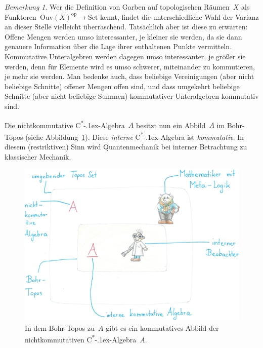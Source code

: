 \documentclass[a4paper,ngerman,12pt]{scrartcl}
\theoremstyle{definition}
\theoremstyle{plain}
\theoremstyle{remark}
\newtheorem{bem}[defn]{Bemerkung}
\newcommand{\Ouv}{\mathrm{Ouv}}
\newcommand{\ul}[1]{\underline{#1}}
\newcommand{\csalgebra}{C\textsuperscript{*}\kern-.1ex-Algebra}
\newcommand{\op}{\mathrm{op}}
\newcommand{\Set}{\mathrm{Set}}
\renewcommand{\_}{\mathpunct{.}\,}
\newcommand{\?}{\,{:}\,}
\begin{document}
\begin{bem}Wer die Definition von Garben auf topologischen Räumen~$X$ als
Funktoren~$\Ouv(X)^\op \to \Set$
kennt, findet die unterschiedliche Wahl der Varianz an dieser Stelle vielleicht
überraschend. Tatsächlich aber ist diese zu erwarten: Offene Mengen werden umso
interessanter, je kleiner sie werden, da sie dann genauere Information über die
Lage ihrer enthaltenen Punkte vermitteln. Kommutative Unteralgebren werden
dagegen umso interessanter, je größer sie werden, denn für Elemente wird
es umso schwerer, miteinander zu kommutieren, je mehr sie werden. Man bedenke auch, dass
beliebige Vereinigungen (aber nicht beliebige Schnitte) offener Mengen offen
sind, und dass umgekehrt beliebige Schnitte (aber nicht beliebige
Summen) kommutativer Unteralgebren kommutativ sind.\end{bem}

Die nichtkommutative \csalgebra~$A$ besitzt nun ein Abbild~$\ul{A}$ im
Bohr-Topos (siehe Abbildung~\ref{fig:bohr-topos}). Diese \emph{interne}
\csalgebra{} ist \emph{kommutativ}. In diesem
(restriktiven) Sinn wird Quantenmechanik bei interner Betrachtung zu klassischer
Mechanik.

\begin{figure}
  \centering
  \includegraphics[scale=3]{bohr-topos-klein}
  \caption{\label{fig:bohr-topos}In dem Bohr-Topos zu~$A$ gibt es ein kommutatives
  Abbild der nichtkommutativen \csalgebra~$A$.}
\end{figure}
\end{document}

